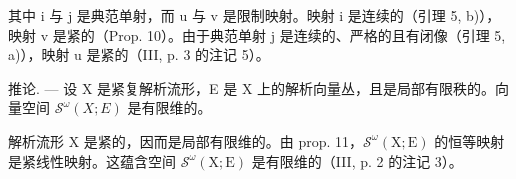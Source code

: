 其中 i 与 j 是典范单射，而 u 与 v 是限制映射。映射 i 是连续的（引理 5, b)），映射 v 是紧的（Prop. 10）。由于典范单射 j 是连续的、严格的且有闭像（引理 5, a)），映射 u 是紧的（III, p. 3 的注记 5）。

推论. --- 设 X 是紧复解析流形，E 是 X 上的解析向量丛，且是局部有限秩的。向量空间 \(\mathcal{S}^{\omega}(X;E)\) 是有限维的。

解析流形 X 是紧的，因而是局部有限维的。由 prop. 11，\(\mathcal{S}^{\omega}(\mathrm{X};\mathrm{E})\) 的恒等映射是紧线性映射。这蕴含空间 \(\mathcal{S}^{\omega}(\mathrm{X};\mathrm{E})\) 是有限维的（III, p. 2 的注记 3）。

